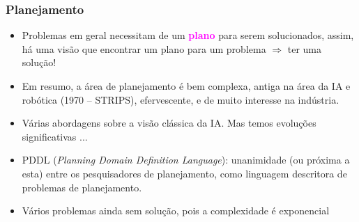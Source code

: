 \begin{frame}[fragile]

    \frametitle{Planejamento}

   \begin{block}{}
     \begin{itemize}
 
       
      \item Problemas em geral necessitam de um \textcolor{magenta}{\textbf{plano}} 
      para serem solucionados, assim,
      há uma visão que encontrar um plano para um problema $\Rightarrow$ ter uma solução!

      \pause
      \item Em resumo, a área de planejamento é bem complexa, 
       antiga na área da IA e robótica (1970 -- STRIPS), 
       efervescente, e de muito interesse na indústria.
           
      \pause
      \item Várias abordagens sobre a visão clássica da IA. Mas temos evoluções
      significativas ...
      
      \pause
      \item PDDL (\textit{Planning Domain Definition Language}): unanimidade (ou próxima a esta)
      entre os pesquisadores de planejamento, como linguagem descritora
      de problemas de planejamento.

      \pause
      \item Vários problemas ainda sem solução, pois a complexidade é exponencial 
      
      
      

    \end{itemize}
    
    \end{block}
    
\end{frame}



